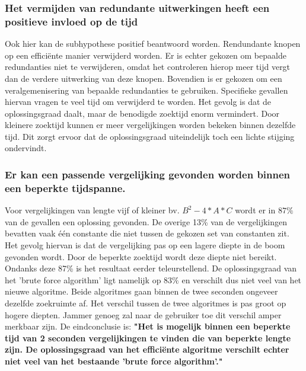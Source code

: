 \documentclass[Main.tex]{subfiles}
\begin{document}
\subsubsection{Het vermijden van redundante uitwerkingen heeft een positieve invloed op de tijd}
Ook hier kan de subhypothese positief beantwoord worden. Rendundante knopen op een effici\"ente manier verwijderd worden. Er is echter gekozen om bepaalde redundanties niet te verwijderen, omdat het controleren hierop meer tijd vergt dan de verdere uitwerking van deze knopen. Bovendien is er gekozen om een veralgemenisering van bepaalde redundanties te gebruiken. Specifieke gevallen hiervan vragen te veel tijd om verwijderd te worden. Het gevolg is dat de oplossingsgraad daalt, maar de benodigde zoektijd enorm vermindert. Door kleinere zoektijd kunnen er meer vergelijkingen worden bekeken binnen dezelfde tijd. Dit zorgt ervoor dat de oplossingsgraad uiteindelijk toch een lichte stijging ondervindt.

\subsubsection{Er kan een passende vergelijking gevonden worden binnen een beperkte tijdspanne.}
Voor vergelijkingen van lengte vijf of kleiner bv. $B^{2} - 4 \ast A \ast C$ wordt er in $87\%$ van de gevallen een oplossing gevonden. De overige 13\% van de vergelijkingen bevatten vaak \'e\'en constante die niet tussen de gekozen set van constanten zit. Het gevolg hiervan is dat de vergelijking pas op een lagere diepte in de boom gevonden wordt. Door de beperkte zoektijd wordt deze diepte niet bereikt. Ondanks deze 87\% is het resultaat eerder teleurstellend. De oplossingsgraad van het 'brute force algorithm' ligt namelijk op $83\%$ en verschilt dus niet veel van het nieuwe algoritme. Beide algoritmes gaan binnen de twee seconden ongeveer dezelfde zoekruimte af. Het verschil tussen de twee algoritmes is pas groot op hogere diepten. Jammer genoeg zal naar de gebruiker toe dit verschil amper merkbaar zijn. De eindconclusie is: \textbf{"Het is mogelijk binnen een beperkte tijd van 2 seconden vergelijkingen te vinden die van beperkte lengte zijn. De oplossingsgraad van het effici\"ente algoritme verschilt echter niet veel van het bestaande 'brute force algorithm'."}
\end{document}
